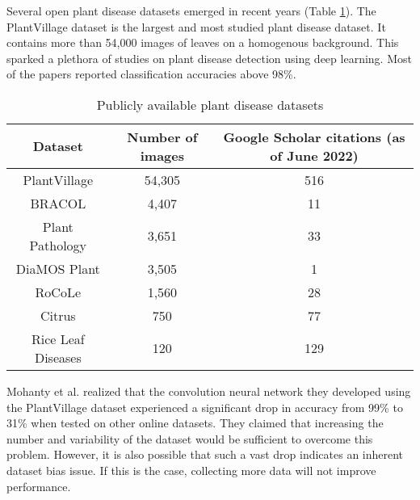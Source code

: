 \documentclass{article}
\begin{document}
Several open plant disease datasets emerged in recent years (Table \ref{table:1}). The PlantVillage dataset is the largest and most studied plant disease dataset. It contains more than 54,000 images of leaves on a homogenous background. This sparked a plethora of studies on plant disease detection using deep learning\cite{Mohanty2016, Ferentinos2018}. Most of the papers reported classification accuracies above 98\%.

\begin{table}
\centering
\begin{tabular}{c|c|c}
Dataset & Number of images & Google Scholar citations (as of June 2022) \\\hline
PlantVillage\cite{Hughes2015} & 54,305 & 516 \\
BRACOL\cite{Krohling2019} & 4,407 & 11 \\
Plant Pathology\cite{Thapa2020} & 3,651 &33 \\
DiaMOS Plant\cite{Fenu2021} & 3,505 & 1 \\
RoCoLe\cite{Parraga-Alava2019} & 1,560 & 28 \\
Citrus\cite{Rauf2019} & 750 & 77 \\
Rice Leaf Diseases\cite{Prajapati2017} & 120 & 129 \\
\end{tabular}
\caption{Publicly available plant disease datasets}
\label{table:1}
\end{table}

Mohanty et al.\cite{Mohanty2016} realized that the convolution neural network they developed using the PlantVillage dataset experienced a significant drop in accuracy from 99\% to 31\% when tested on other online datasets. They claimed that increasing the number and variability of the dataset would be sufficient to overcome this problem. However, it is also possible that such a vast drop indicates an inherent dataset bias issue. If this is the case, collecting more data will not improve performance. 
\end{document}

